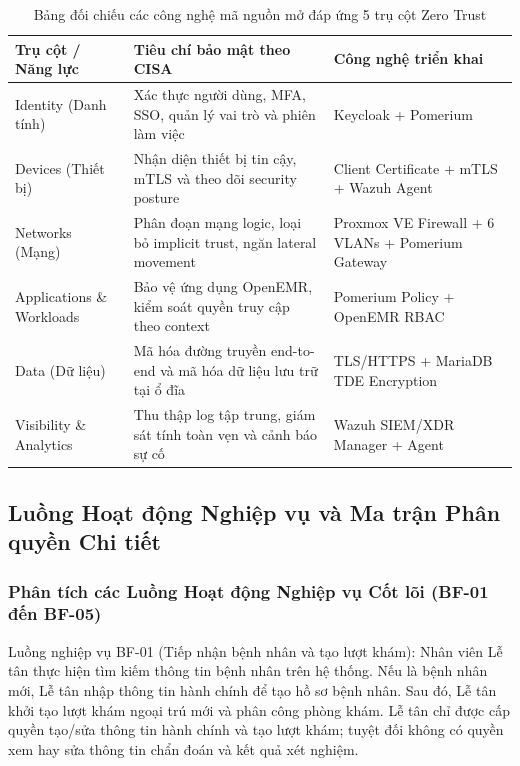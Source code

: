 \begingroup
\setlength\LTleft{0pt}
\setlength\LTright{0pt}
\begin{longtable}{| >{\raggedright\arraybackslash}p{3.2cm} | >{\raggedright\arraybackslash}p{5.5cm} | >{\raggedright\arraybackslash}p{5.5cm} |}
\caption{Bảng đối chiếu các công nghệ mã nguồn mở đáp ứng 5 trụ cột Zero Trust} \label{tab:cisa_mapping} \\
\hline
\textbf{Trụ cột / Năng lực} & \textbf{Tiêu chí bảo mật theo CISA} & \textbf{Công nghệ triển khai} \\ \hline
\endhead
\hline
\endfoot

Identity (Danh tính) & Xác thực người dùng, MFA, SSO, quản lý vai trò và phiên làm việc & Keycloak + Pomerium \\ \hline
Devices (Thiết bị) & Nhận diện thiết bị tin cậy, mTLS và theo dõi security posture & Client Certificate + mTLS + Wazuh Agent \\ \hline
Networks (Mạng) & Phân đoạn mạng logic, loại bỏ implicit trust, ngăn lateral movement & Proxmox VE Firewall + 6 VLANs + Pomerium Gateway \\ \hline
Applications \& Workloads & Bảo vệ ứng dụng OpenEMR, kiểm soát quyền truy cập theo context & Pomerium Policy + OpenEMR RBAC \\ \hline
Data (Dữ liệu) & Mã hóa đường truyền end-to-end và mã hóa dữ liệu lưu trữ tại ổ đĩa & TLS/HTTPS + MariaDB TDE Encryption \\ \hline
Visibility \& Analytics & Thu thập log tập trung, giám sát tính toàn vẹn và cảnh báo sự cố & Wazuh SIEM/XDR Manager + Agent \\ \hline
\end{longtable}
\endgroup

\subsection{Luồng Hoạt động Nghiệp vụ và Ma trận Phân quyền Chi tiết}

\subsubsection{Phân tích các Luồng Hoạt động Nghiệp vụ Cốt lõi (BF-01 đến BF-05)}

Luồng nghiệp vụ BF-01 (Tiếp nhận bệnh nhân và tạo lượt khám): Nhân viên Lễ tân thực hiện tìm kiếm thông tin bệnh nhân trên hệ thống. Nếu là bệnh nhân mới, Lễ tân nhập thông tin hành chính để tạo hồ sơ bệnh nhân. Sau đó, Lễ tân khởi tạo lượt khám ngoại trú mới và phân công phòng khám. Lễ tân chỉ được cấp quyền tạo/sửa thông tin hành chính và tạo lượt khám; tuyệt đối không có quyền xem hay sửa thông tin chẩn đoán và kết quả xét nghiệm.

